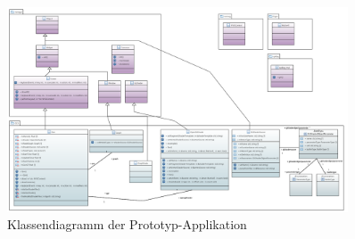 \begin{figure}[H]
    \centering
    \includegraphics[width=0.9\textwidth]{img/prototype_class_diagram.png}
    \caption{Klassendiagramm der
        Prototyp-Applikation\protect\footnotemark}\label{fig:class-diagram:prototype}
\end{figure}

